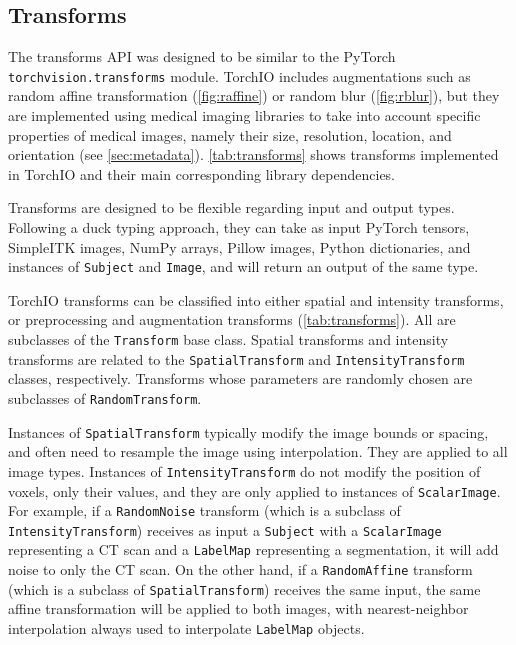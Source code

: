 \subsection{Transforms}
\label{sec:transforms}

The transforms \ac{API} was designed to be similar to the PyTorch \texttt{torchvision.transforms} module.
TorchIO includes augmentations such as random affine transformation (\cref{fig:raffine}) or random blur (\cref{fig:rblur}), but they are implemented using medical imaging libraries \cite{lowekamp_design_2013,brett_nipynibabel_2020} to take into account specific properties of medical images, namely their size, resolution, location, and orientation (see \cref{sec:metadata}).
\cref{tab:transforms} shows transforms implemented in TorchIO \torchioversion and their main corresponding library dependencies.





Transforms are designed to be flexible regarding input and output types.
Following a duck typing approach, they can take as input PyTorch tensors, SimpleITK images, NumPy arrays, Pillow images, Python dictionaries, and instances of \texttt{Subject} and \texttt{Image}, and will return an output of the same type.

TorchIO transforms can be classified into either spatial and intensity transforms, or preprocessing and augmentation transforms (\cref{tab:transforms}).
All are subclasses of the \texttt{Transform} base class.
Spatial transforms and intensity transforms are related to the \texttt{SpatialTransform} and \texttt{IntensityTransform} classes, respectively.
Transforms whose parameters are randomly chosen are subclasses of \texttt{RandomTransform}.

Instances of \texttt{SpatialTransform} typically modify the image bounds or spacing, and often need to resample the image using interpolation.
They are applied to all image types.
Instances of \texttt{IntensityTransform} do not modify the position of voxels, only their values, and they are only applied to instances of \texttt{ScalarImage}.
For example, if a \texttt{RandomNoise} transform (which is a subclass of \texttt{IntensityTransform}) receives as input a \texttt{Subject} with a \texttt{ScalarImage} representing a \ac{CT} scan and a \texttt{LabelMap} representing a segmentation, it will add noise to only the \ac{CT} scan.
On the other hand, if a \texttt{RandomAffine} transform (which is a subclass of \texttt{SpatialTransform}) receives the same input, the same affine transformation will be applied to both images, with nearest-neighbor interpolation always used to interpolate \texttt{LabelMap} objects.


